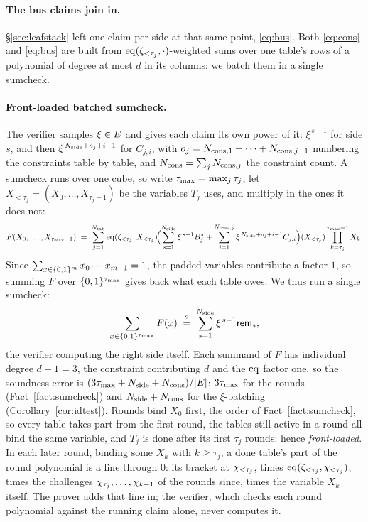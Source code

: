 \paragraph{The bus claims join in.} \S\ref{sec:leafstack} left one claim per side at that same point, \eqref{eq:bus}. Both \eqref{eq:cons} and \eqref{eq:bus} are built from $\operatorname{eq}(\zeta_{<\tau_j},\cdot)$-weighted sums over one table's rows of a polynomial of degree at most $d$ in its columns: we batch them in a single sumcheck.

\paragraph{Front-loaded batched sumcheck.} The verifier samples $\xi\in E$ and gives each claim its own power of it: $\xi^{\,s-1}$ for side $s$, and then $\xi^{\,N_{\mathrm{side}}+o_j+i-1}$ for $C_{j,i}$, with $o_j=N_{\mathrm{cons},1}+\dots+N_{\mathrm{cons},j-1}$ numbering the constraints table by table, and $N_{\mathrm{cons}}=\sum_jN_{\mathrm{cons},j}$ the constraint count. A sumcheck runs over one cube, so write $\tau_{\max}=\max_j\tau_j$, let $X_{<\tau_j}=(X_0,\dots,X_{\tau_j-1})$ be the variables $T_j$ uses, and multiply in the ones it does not:
\[
  F(X_0,\dots,X_{\tau_{\max}-1})\;=\;\sum_{j=1}^{N_{\mathrm{tab}}}\operatorname{eq}(\zeta_{<\tau_j},X_{<\tau_j})\!
  \Bigl(\sum_{s=1}^{N_{\mathrm{side}}}\xi^{\,s-1}B^{s}_j+\sum_{i=1}^{N_{\mathrm{cons},j}}\xi^{\,N_{\mathrm{side}}+o_j+i-1}C_{j,i}\Bigr)(X_{<\tau_j})
  \prod_{k=\tau_j}^{\tau_{\max}-1}X_k .
\]
Since $\sum_{x\in\{0,1\}^{m}}x_0\cdots x_{m-1}=1$, the padded variables contribute a factor $1$, so summing $F$ over $\{0,1\}^{\tau_{\max}}$ gives back what each table owes. We thus run a single sumcheck:
\[
  \sum_{x\in\{0,1\}^{\tau_{\max}}}F(x)\;\stackrel{?}{=}\;\sum_{s=1}^{N_{\mathrm{side}}}\xi^{\,s-1}\mathsf{rem}_{s},
\]
the verifier computing the right side itself. Each summand of $F$ has individual degree $d+1=3$, the constraint contributing $d$ and the $\operatorname{eq}$ factor one, so the soundness error is $(3\tau_{\max}+N_{\mathrm{side}}+N_{\mathrm{cons}})/|E|$: $3\tau_{\max}$ for the rounds (Fact~\ref{fact:sumcheck}) and $N_{\mathrm{side}}+N_{\mathrm{cons}}$ for the $\xi$-batching (Corollary~\ref{cor:idtest}). Rounds bind $X_0$ first, the order of Fact~\ref{fact:sumcheck}, so every table takes part from the first round, the tables still active in a round all bind the same variable, and $T_j$ is done after its first $\tau_j$ rounds: hence \emph{front-loaded}. In each later round, binding some $X_k$ with $k\ge\tau_j$, a done table's part of the round polynomial is a line through $0$: its bracket at $\chi_{<\tau_j}$, times $\operatorname{eq}(\zeta_{<\tau_j},\chi_{<\tau_j})$, times the challenges $\chi_{\tau_j},\dots,\chi_{k-1}$ of the rounds since, times the variable $X_k$ itself. The prover adds that line in; the verifier, which checks each round polynomial against the running claim alone, never computes it.


